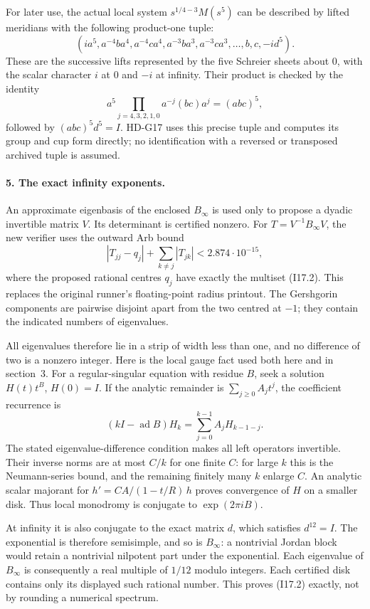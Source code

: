 For later use, the actual local system
$s^{1/4-3}M(s^5)$ can be described by lifted meridians with
the following product-one tuple:
\begin{equation}
 \left(i a^5,
  a^{-4}ba^4,a^{-4}ca^4,
  a^{-3}ba^3,a^{-3}ca^3,\ldots,b,c,-i d^5\right).
                                                        \tag{I17.4}
\end{equation}
These are the successive lifts represented by the five
Schreier sheets about $0$, with the scalar character $i$
at $0$ and $-i$ at infinity.  Their product is checked by the
identity
\[
 a^5\prod_{j=4,3,2,1,0}a^{-j}(bc)a^j=(abc)^5,
\]
followed by $(abc)^5d^5=I$.  HD-G17 uses this precise tuple
and computes its group and cup form directly; no identification
with a reversed or transposed archived tuple is assumed.

\paragraph{5. The exact infinity exponents.}
An approximate eigenbasis of the enclosed $B_\infty$ is used
only to propose a dyadic invertible matrix $V$.  Its determinant
is certified nonzero.  For $T=V^{-1}B_\infty V$, the new verifier
uses the outward Arb bound
\[
 \left|T_{jj}-q_j\right|+\sum_{k\ne j}|T_{jk}|
        <2.874\cdot10^{-15},
\]
where the proposed rational centres $q_j$ have exactly the
multiset (I17.2).  This replaces the original runner's
floating-point radius printout.  The Gershgorin components
are pairwise disjoint apart from the two centred at $-1$;
they contain the indicated numbers of eigenvalues.

All eigenvalues therefore lie in a strip of width less than one,
and no difference of two is a nonzero integer.  Here is the
local gauge fact used both here and in section~3.  For a
regular-singular equation with residue $B$, seek a solution
$H(t)t^B$, $H(0)=I$.  If the analytic remainder is
$\sum_{j\geq0}A_jt^j$, the coefficient recurrence is
\[
 (kI-\operatorname{ad}B)H_k
          =\sum_{j=0}^{k-1}A_jH_{k-1-j}.
\]
The stated eigenvalue-difference condition makes all left
operators invertible.  Their inverse norms are at most $C/k$
for one finite $C$: for large $k$ this is the Neumann-series
bound, and the remaining finitely many $k$ enlarge $C$.
An analytic scalar majorant for
$h'=C A/(1-t/R)\,h$ proves convergence of $H$ on a smaller
disk.  Thus local monodromy is conjugate to $\exp(2\pi iB)$.

At infinity it is also conjugate to the exact matrix $d$,
which satisfies $d^{12}=I$.  The exponential is therefore
semisimple, and so is $B_\infty$: a nontrivial Jordan block
would retain a nontrivial nilpotent part under the exponential.
Each eigenvalue of $B_\infty$ is consequently a real multiple
of $1/12$ modulo integers.  Each certified disk contains
only its displayed such rational number.  This proves (I17.2)
exactly, not by rounding a numerical spectrum.

